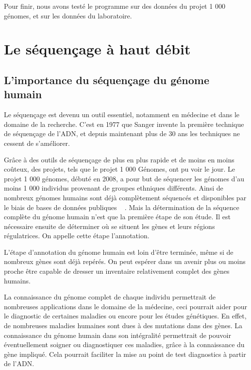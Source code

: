 \documentclass[a4paper,12pt]{article}
\begin{document}
Pour finir, nous avons testé le programme sur des données du projet 1 000 génomes, et sur les données du laboratoire. \\

\clearpage

\section{Le séquençage à haut débit}

\subsection{L'importance du séquençage du génome humain}

Le séquençage est devenu un outil essentiel, notamment en médecine et dans le domaine de la recherche. C'est en 1977 que Sanger invente la première technique de séquençage de l'ADN, et depuis maintenant plus de 30 ans les techniques ne cessent de s'améliorer. 

Grâce à des outils de séquençage de plus en plus rapide et de moins en moins coûteux, des projets, tels que le projet 1 000 Génomes, ont pu voir le jour. Le projet 1 000 génomes, débuté en 2008, a pour but de séquencer les génomes d'au moins 1 000 individus provenant de groupes ethniques différents. Ainsi de nombreux génomes humains sont déjà complètement séquencés et disponibles par le biais de bases de données publiques ~\cite{1000Genomes} . Mais la détermination de la séquence complète du génome humain n'est que la première étape de son étude. Il est nécessaire ensuite de déterminer où se situent les gènes et leurs régions régulatrices. On appelle cette étape l'annotation. 

L'étape d'annotation du génome humain est loin d'être terminée, même si de nombreux gènes sont déjà repérés. On peut espérer  dans un avenir plus ou moins proche être capable de dresser un inventaire relativement complet des gènes humains. 

La connaissance du génome complet de chaque individu permettrait de nombreuses applications dans le domaine de la médecine, ceci pourrait aider pour le diagnostic de certaines maladies ou encore pour les études génétiques. En effet, de  nombreuses maladies humaines sont dues à des mutations dans des gènes. La connaissance du génome humain dans son intégralité permettrait de pouvoir éventuellement soigner ou diagnostiquer ces maladies, grâce à la connaissance du gène impliqué. Cela pourrait faciliter la mise au point de test diagnostics à partir de l'ADN. 
\end{document}
